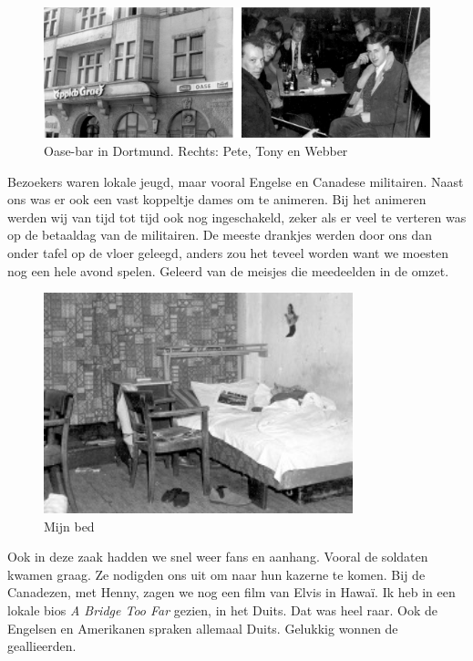 \documentclass[12pt,twoside, openright]{memoir}
\begin{document}
\begin{figure}
\centering
\includegraphics[width=\textwidth]{img/ch29/double}
\caption*{\footnotesize Oase-bar in Dortmund. Rechts: Pete, Tony en Webber}
\end{figure}

Bezoekers waren lokale jeugd, maar vooral Engelse en Canadese militairen. Naast ons was er ook een vast koppeltje dames om te animeren. Bij het animeren werden wij van tijd tot tijd ook nog ingeschakeld, zeker als er veel te verteren was op de betaaldag van de militairen. De meeste drankjes werden door ons dan onder tafel op de vloer geleegd, anders zou het teveel worden want we moesten nog een hele avond spelen. Geleerd van de meisjes die meedeelden in de omzet. 

\begin{figure}
\centering
\includegraphics[width=0.8\textwidth]{img/5Soest1A}
\caption*{\footnotesize Mijn bed}
\end{figure}

Ook in deze zaak hadden we snel weer fans en aanhang. Vooral de soldaten kwamen graag. Ze nodigden ons uit om naar hun kazerne te komen. Bij de Canadezen, met Henny, zagen we nog een film van Elvis in Hawaï. Ik heb in een lokale bios \emph{A Bridge Too Far} gezien, in het Duits. Dat was heel raar. Ook de Engelsen en Amerikanen spraken allemaal Duits. Gelukkig wonnen de geallieerden.
\end{document}

